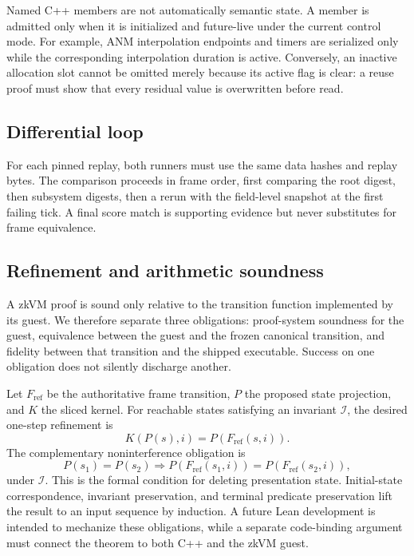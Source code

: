 Named C++ members are not automatically semantic state.  A member is admitted
only when it is initialized and future-live under the current control mode.
For example, ANM interpolation endpoints and timers are serialized only while
the corresponding interpolation duration is active.  Conversely, an inactive
allocation slot cannot be omitted merely because its active flag is clear: a
reuse proof must show that every residual value is overwritten before read.

\subsection{Differential loop}

For each pinned replay, both runners must use the same data hashes and replay
bytes.  The comparison proceeds in frame order, first comparing the root digest,
then subsystem digests, then a rerun with the field-level snapshot at the first
failing tick.  A final score match is supporting evidence but never substitutes
for frame equivalence.

\subsection{Refinement and arithmetic soundness}

A zkVM proof is sound only relative to the transition function implemented by
its guest.  We therefore separate three obligations: proof-system soundness for
the guest, equivalence between the guest and the frozen canonical transition,
and fidelity between that transition and the shipped executable.  Success on
one obligation does not silently discharge another.

Let $F_{\mathrm{ref}}$ be the authoritative frame transition, $P$ the proposed
state projection, and $K$ the sliced kernel.  For reachable states satisfying
an invariant $\mathcal{I}$, the desired one-step refinement is
\[
  K(P(s),i) = P(F_{\mathrm{ref}}(s,i)).
\]
The complementary noninterference obligation is
\[
  P(s_1)=P(s_2) \Longrightarrow
  P(F_{\mathrm{ref}}(s_1,i))=P(F_{\mathrm{ref}}(s_2,i)),
\]
under $\mathcal{I}$.  This is the formal condition for deleting presentation
state.  Initial-state correspondence, invariant preservation, and terminal
predicate preservation lift the result to an input sequence by induction.  A
future Lean development is intended to mechanize these obligations, while a
separate code-binding argument must connect the theorem to both C++ and the
zkVM guest.

